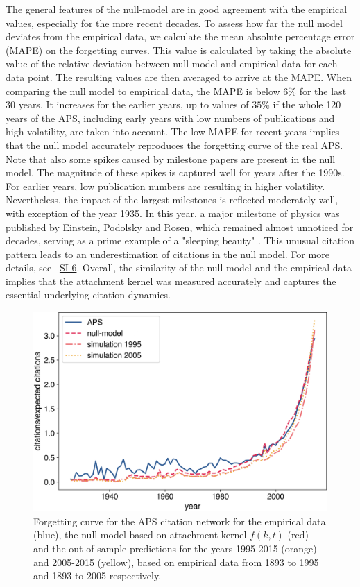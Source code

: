 \documentclass[draft,final]{vutinfth} %
\begin{document}
The general features of the null-model are in good agreement with the empirical values, especially for the more recent decades. To assess how far the null model deviates from the empirical data, we calculate the mean absolute percentage error (MAPE) on the forgetting curves. This value is calculated by taking the absolute value of the relative deviation between null model and empirical data for each data point. The resulting values are then averaged to arrive at the MAPE. When comparing the null model to empirical data, the MAPE is below $6\%$ for the last 30 years. It increases for the earlier years, up to values of $35\%$ if the whole 120 years of the APS, including early years with low numbers of publications and high volatility, are taken into account. The low MAPE for recent years implies that the null model accurately reproduces the forgetting curve of the real APS. Note that also some spikes caused by milestone papers are present in the null model. The magnitude of these spikes is captured well for years after the 1990s. For earlier years, low publication numbers are resulting in higher volatility. Nevertheless, the impact of the largest milestones is reflected moderately well, with exception of the year 1935. In this year, a major milestone of physics was published by Einstein, Podolsky and Rosen, which remained almost unnoticed for decades, serving as a prime example of a "sleeping beauty" \cite{Ke2015}. This unusual citation pattern leads to an underestimation of citations in the null model. For more details, see ~\hyperref[SI6]{SI 6}. Overall, the similarity of the null model and the empirical data implies that the attachment kernel was measured accurately and  captures the essential underlying citation dynamics.

\begin{figure}[h!]
	\centering
	  \includegraphics[width=0.7\columnwidth]{figures_aps/2.png}
		\caption{Forgetting curve for the APS citation network for the empirical data (blue), the null model based on attachment kernel $f(k, t)$ (red) and the out-of-sample predictions for the years 1995-2015 (orange) and 2005-2015 (yellow), based on empirical data from 1893 to 1995 and 1893 to 2005 respectively.}
	\label{fig:nullcomparison}
\end{figure}
\end{document}
